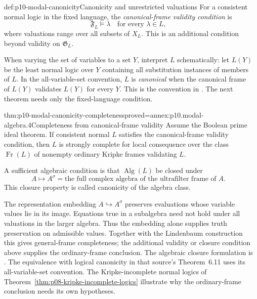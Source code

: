 \begin{hbdefinition}{def:p10-modal-canonicity}{Canonicity and unrestricted valuations}
For a consistent normal logic in the fixed language, the
\emph{canonical-frame validity condition} is
\[
 \mathfrak F_L\models\lambda\quad\text{for every }\lambda\in L,
\]
where valuations range over all subsets of \(X_L\).
This is an additional condition beyond validity on
\(\mathfrak G_L\).

When varying the set of variables to a set \(Y\), interpret \(L\)
schematically: let \(L(Y)\) be the least normal logic over \(Y\)
containing all substitution instances of members of \(L\).
In the all-variable-set convention, \(L\) is \emph{canonical}
when the canonical frame of \(L(Y)\) validates \(L(Y)\) for
every \(Y\).
This is the convention in
\cite[Definition~6.10, p.~31]{Venema2005Preprint}.
The next theorem needs only the fixed-language condition.
\end{hbdefinition}

\begin{hbtheorem}{thm:p10-modal-canonicity-completeness}{proved=annex:p10.modal-algebra.4}{Completeness from canonical-frame validity}
Assume the Boolean prime ideal theorem.
If consistent normal \(L\) satisfies the canonical-frame validity
condition, then \(L\) is strongly complete for local consequence
over the class \(\operatorname{Fr}(L)\) of nonempty ordinary
Kripke frames validating \(L\).

A sufficient algebraic condition is that
\(\operatorname{Alg}(L)\) be closed under
\[
 A\longmapsto A^\sigma
       =\text{the full complex algebra of the ultrafilter frame of }A.
\]
This closure property is called canonicity of the algebra class.
\end{hbtheorem}

The representation embedding \(A\hookrightarrow A^\sigma\)
preserves evaluations whose variable values lie in its image.
Equations true in a subalgebra need not hold under all valuations
in the larger algebra.  Thus the embedding alone supplies
truth preservation on admissible values.  Together with the
Lindenbaum construction this gives general-frame completeness;
the additional validity or
closure condition above supplies the ordinary-frame conclusion.
The algebraic closure formulation is
\cite[Definition~6.9 and Theorem~6.12, p.~31]{Venema2005Preprint}.
The equivalence with logical canonicity in that source's
Theorem~6.11 uses its all-variable-set convention.
The Kripke-incomplete normal logics of
Theorem~\ref{thm:p08-kripke-incomplete-logics} illustrate why the
ordinary-frame conclusion needs its own hypotheses.
